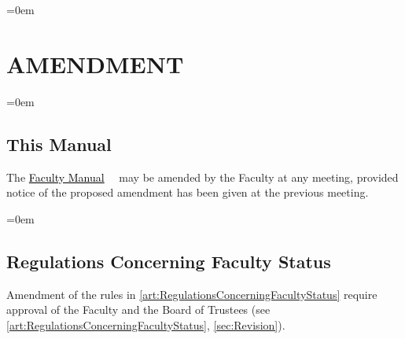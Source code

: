 \documentclass{manual}
\let\stdsection\section %
\renewcommand\section{\newpage\stdsection}
\newcommand{\keyword}[1]{\textcolor{black}{#1}}
\newcommand{\facman}{\keyword{\underline{Faculty Manual}}~}
\let\oldsection\section
\renewcommand\section{\leftskip=0em\oldsection}
\let\oldsubsection\subsection
\renewcommand\subsection{\leftskip=0em\oldsubsection}
\begin{document}
\section{AMENDMENT}\label{art:Amendment}

\subsection{This Manual}
The \facman~ may be amended by the Faculty at any meeting, provided notice of the proposed amendment has been given at the previous meeting.

\subsection{Regulations Concerning Faculty Status}
Amendment of the rules in \cref{art:RegulationsConcerningFacultyStatus} require approval of the Faculty and the Board of Trustees (see \cref{art:RegulationsConcerningFacultyStatus}, \cref{sec:Revision}).
\end{document}
